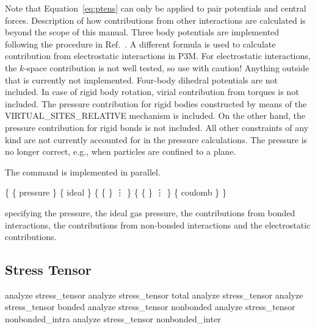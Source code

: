 Note that Equation~\ref{eq:ptens} can only be applied to pair potentials and central forces.
Description of how contributions from other interactions are calculated is beyond the scope
of this manual. Three body potentials are implemented following the procedure in 
Ref.~\cite{thompson09a}.
A different formula is used to calculate contribution from electrostatic interactions 
in P3M. For electrostatic interactions, the $k$-space contribution is not 
well tested, so use with caution!
Anything outside that is currently not implemented.
Four-body dihedral potentials are not included.
In case of rigid body rotation, virial contribution from torques is not included.
The pressure contribution for rigid bodies constructed by means of the VIRTUAL\_SITES\_RELATIVE mechanism is included. On the other hand, the pressure contribution for rigid bonds is not included.
All other constraints of any kind are not currently accounted for in the pressure calculations. 
The pressure is no longer correct, e.g., when particles are confined to a plane.

The command is implemented in parallel.


\begin{code}
\{ \{ pressure  \}
   \{ ideal  \} 
   \{ \{   \}
      \vdots
   \}
   \{ \{   \}
      \vdots
   \}
   \{ coulomb  \}
\}
\end{code}
specifying the pressure, the ideal gas pressure, the
contributions from bonded interactions, the contributions from
non-bonded interactions and the electrostatic contributions.


\subsection{Stress Tensor}
\label{analyze:stresstensor}

\begin{essyntax}
   analyze stress_tensor
   analyze stress_tensor total
   analyze stress_tensor 
   analyze stress_tensor bonded 
   analyze stress_tensor nonbonded  
   analyze stress_tensor nonbonded_intra 
   analyze stress_tensor nonbonded_inter 
\end{essyntax}

